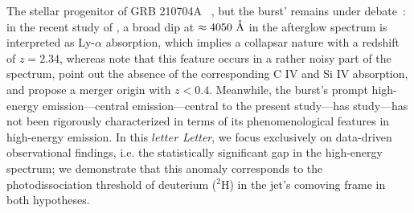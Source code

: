\documentclass[linenumbers,twocolumn]{aastex631}
\providecommand{\DIFaddtex}[1]{{\protect\color{blue} \sf #1}} %
\providecommand{\DIFdeltex}[1]{{\protect\color{red} \scriptsize #1}} %
\providecommand{\DIFaddbegin}{} %
\providecommand{\DIFaddend}{} %
\providecommand{\DIFdelbegin}{} %
\providecommand{\DIFdelend}{} %
\providecommand{\DIFadd}[1]{\texorpdfstring{\DIFaddtex{#1}}{#1}} %
\providecommand{\DIFdel}[1]{\texorpdfstring{\DIFdeltex{#1}}{}} %
\begin{document}
\DIFadd{The }\DIFaddend stellar progenitor of GRB 210704A \DIFdelbegin \DIFdel{~\citep{2021GCN.30380....1M,2023MNRAS.522.5204B}, but the burst’}\DIFdelend \DIFaddbegin \DIFadd{remains under debate~\citep{2021GCN.30380....1M,2023MNRAS.522.5204B,2026MNRAS.548ag555P}: in the recent study of \cite{2026MNRAS.548ag555P}, a broad dip at $\approx 4050~\mathring{\rm A}$ in the afterglow spectrum is interpreted as Ly-$\alpha$ absorption, which implies a collapsar nature with a redshift of $z = 2.34$, whereas \cite{2023MNRAS.522.5204B} note that this feature occurs in a rather noisy part of the spectrum, point out the absence of the corresponding C IV and Si IV absorption, and propose a merger origin with $z<0.4$. Meanwhile, the burst'}\DIFaddend s prompt high-energy \DIFdelbegin \DIFdel{emission—central }\DIFdelend \DIFaddbegin \DIFadd{emission---central }\DIFaddend to the present \DIFdelbegin \DIFdel{study—has }\DIFdelend \DIFaddbegin \DIFadd{study---has }\DIFaddend not been rigorously characterized in terms of its phenomenological features\DIFdelbegin \DIFdel{in high-energy emission}\DIFdelend . In this \DIFdelbegin \DIFdel{$letter$}\DIFdelend \DIFaddbegin \DIFadd{\textit{Letter}}\DIFaddend , we focus exclusively on data-driven observational findings, i.e. the statistically significant gap in the high-energy spectrum; we demonstrate that this anomaly corresponds to the photodissociation threshold of deuterium ($^2$H) in the jet's comoving frame \DIFaddbegin \DIFadd{in both hypotheses}\DIFaddend .








\DIFdelbegin %
\end{document}
